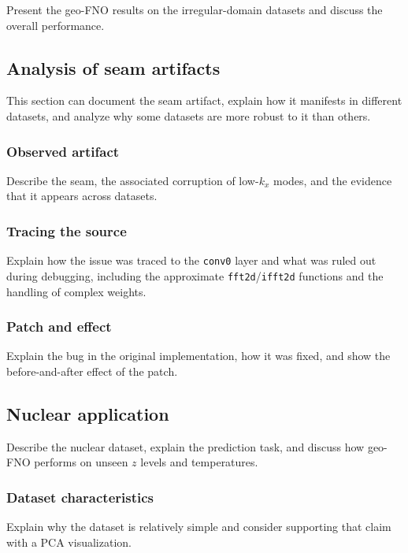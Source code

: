 Present the geo-FNO results on the irregular-domain datasets and
discuss the overall performance.

\subsection{Analysis of seam artifacts}

This section can document the seam artifact, explain how it manifests in
different datasets, and analyze why some datasets are more robust to it
than others.

\subsubsection{Observed artifact}

Describe the seam, the associated corruption of low-$k_x$ modes, and
the evidence that it appears across datasets.

\subsubsection{Tracing the source}

Explain how the issue was traced to the \texttt{conv0} layer and what
was ruled out during debugging, including the approximate
\texttt{fft2d}/\texttt{ifft2d} functions and the handling of complex
weights.

\subsubsection{Patch and effect}

Explain the bug in the original implementation, how it was fixed, and
show the before-and-after effect of the patch.

\subsection{Nuclear application}

Describe the nuclear dataset, explain the prediction task, and discuss
how geo-FNO performs on unseen $z$ levels and temperatures.

\subsubsection{Dataset characteristics}

Explain why the dataset is relatively simple and consider supporting
that claim with a PCA visualization.

